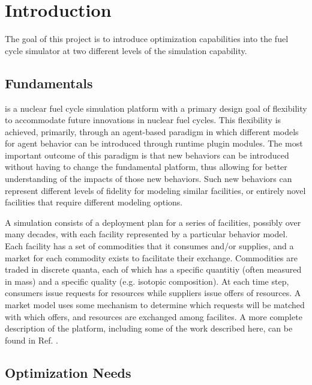 
\section{Introduction}

The goal of this project is to introduce optimization capabilities into the
\Cyclus{} fuel cycle simulator at two different levels of the simulation
capability.  

\subsection{\Cyclus{} Fundamentals}

\Cyclus{} is a nuclear fuel cycle simulation platform with a primary design
goal of flexibility to accommodate future innovations in nuclear fuel cycles.
This flexibility is achieved, primarily, through an agent-based paradigm in
which different models for agent behavior can be introduced through runtime
plugin modules.  The most important outcome of this paradigm is that new
behaviors can be introduced without having to change the fundamental platform,
thus allowing for better understanding of the impacts of those new behaviors.
Such new behaviors can represent different levels of fidelity for modeling
similar facilities, or entirely novel facilities that require different
modeling options.

A \Cyclus{} simulation consists of a deployment plan for a series of
facilities, possibly over many decades, with each facility represented by a
particular behavior model.  Each facility has a set of commodities that it
consumes and/or supplies, and a market for each commodity exists to facilitate
their exchange.  Commodities are traded in discrete quanta,
each of which has a specific quantitiy (often measured in mass) and a specific
quality (e.g. isotopic composition).  At each time step, consumers issue
requests for resources while suppliers issue offers of resources. A market
model uses some mechanism to determine which requests will be matched with
which offers, and resources are exchanged among facilites.  A more complete
description of the \Cyclus{} platform, including some of the work described
here, can be found in Ref. .

\subsection{Optimization Needs}

